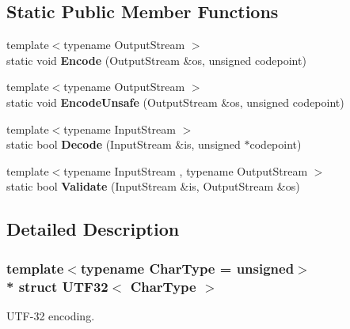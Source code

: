 \subsection*{Static Public Member Functions}
\begin{DoxyCompactItemize}
\item 
{\footnotesize template$<$typename Output\+Stream $>$ }\\static void {\bfseries Encode} (Output\+Stream \&os, unsigned codepoint)\hypertarget{structUTF32_a511d1b09672ce535085895a28d8c2f13}{}\label{structUTF32_a511d1b09672ce535085895a28d8c2f13}

\item 
{\footnotesize template$<$typename Output\+Stream $>$ }\\static void {\bfseries Encode\+Unsafe} (Output\+Stream \&os, unsigned codepoint)\hypertarget{structUTF32_ae50dd8dff92c36ee184c6d4eccb1961e}{}\label{structUTF32_ae50dd8dff92c36ee184c6d4eccb1961e}

\item 
{\footnotesize template$<$typename Input\+Stream $>$ }\\static bool {\bfseries Decode} (Input\+Stream \&is, unsigned $\ast$codepoint)\hypertarget{structUTF32_a6e7258a5e982e101345dffdc355e9b53}{}\label{structUTF32_a6e7258a5e982e101345dffdc355e9b53}

\item 
{\footnotesize template$<$typename Input\+Stream , typename Output\+Stream $>$ }\\static bool {\bfseries Validate} (Input\+Stream \&is, Output\+Stream \&os)\hypertarget{structUTF32_a71336fb0546b3079e01bbd51d2fa2e45}{}\label{structUTF32_a71336fb0546b3079e01bbd51d2fa2e45}

\end{DoxyCompactItemize}


\subsection{Detailed Description}
\subsubsection*{template$<$typename Char\+Type = unsigned$>$\\*
struct U\+T\+F32$<$ Char\+Type $>$}

U\+T\+F-\/32 encoding. 

